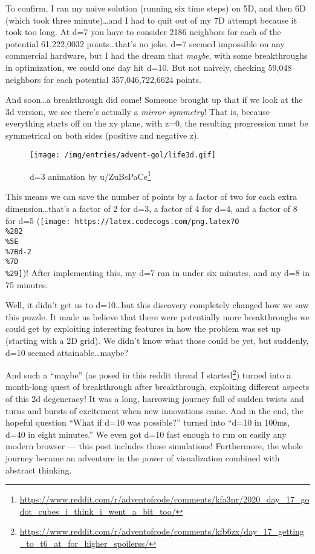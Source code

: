 \documentclass[]{article}
\renewcommand{\href}[2]{#2\footnote{\url{#1}}}
\begin{document}
To confirm, I ran my naive solution (running six time steps) on 5D, and then 6D
(which took three minute)\ldots and I had to quit out of my 7D attempt because
it took too long. At d=7 you have to consider 2186 neighbors for each of the
potential 61,222,0032 points\ldots that's no joke. d=7 seemed impossible on any
commercial hardware, but I had the dream that \emph{maybe}, with some
breakthroughs in optimization, we could one day hit d=10. But not naively,
checking 59,048 neighbors for each potential 357,046,722,6624 points.

And soon\ldots a breakthrough did come! Someone brought up that if we look at
the 3d version, we see there's actually a \emph{mirror symmetry}! That is,
because everything starts off on the xy plane, with z=0, the resulting
progression must be symmetrical on both sides (positive and negative z).

\begin{figure}
\centering
\texttt{[image: /img/entries/advent-gol/life3d.gif]}
\caption{d=3 animation by
\href{https://www.reddit.com/r/adventofcode/comments/kfa3nr/2020_day_17_godot_cubes_i_think_i_went_a_bit_too/}{u/ZuBsPaCe}}
\end{figure}

This means we can save the number of points by a factor of two for each extra
dimension\ldots that's a factor of 2 for d=3, a factor of 4 for d=4, and a
factor of 8 for d=5
(\texttt{[image: https://latex.codecogs.com/png.latex?O\\\%282\\\%5E\\\%7Bd-2\\\%7D\\\%29]})!
After implementing this, my d=7 ran in under six minutes, and my d=8 in 75
minutes.

Well, it didn't get us to d=10\ldots but this discovery completely changed how
we saw this puzzle. It made us believe that there were potentially more
breakthroughs we could get by exploiting interesting features in how the problem
was set up (starting with a 2D grid). We didn't know what those could be yet,
but suddenly, d=10 seemed attainable\ldots maybe?

And such a ``maybe'' (as posed in
\href{https://www.reddit.com/r/adventofcode/comments/kfb6zx/day_17_getting_to_t6_at_for_higher_spoilerss/}{this
reddit thread I started}) turned into a month-long quest of breakthrough after
breakthrough, exploiting different aspects of this 2d degeneracy! It was a long,
harrowing journey full of sudden twists and turns and bursts of excitement when
new innovations came. And in the end, the hopeful question ``What if d=10 was
possible?'' turned into ``d=10 in 100ms, d=40 in eight minutes.'' We even got
d=10 fast enough to run on easily any modern browser --- this post includes
those simulations! Furthermore, the whole journey became an adventure in the
power of visualization combined with abstract thinking.
\end{document}
